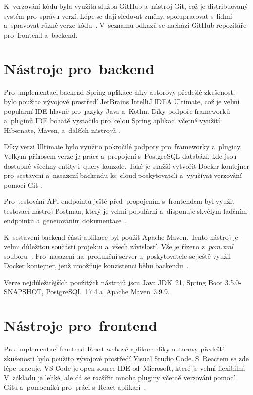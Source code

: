 \documentclass[twoside]{ctuthesis}
\begin{document}
K~verzování kódu byla využita služba GitHub a~nástroj Git, což je distribuovaný systém pro~správu verzí. Lépe se dají sledovat změny, spolupracovat s~lidmi a~spravovat různé verze kódu~\cite{git}. V~seznamu odkazů se nachází GitHub repozitáře pro~frontend a~backend.

\section{Nástroje pro~backend}
\label{sec:sixone}

Pro~implementaci backend Spring aplikace díky autorovy předešlé zkušenosti bylo použito vývojové prostředí JetBrains IntelliJ IDEA Ultimate, což je velmi populární IDE hlavně pro~jazyky Java a~Kotlin. Díky podpoře frameworků a~pluginů IDE bohatě vystačilo pro~celou Spring aplikaci včetně využití Hibernate, Maven, a~dalších nástrojů~\cite{idea}.

Díky verzi Ultimate bylo využito pokročilé podpory pro~frameworky a~pluginy. Velkým přínosem verze je práce a~propojení s~PostgreSQL databází, kde jsou dostupné všechny entity i~query konzole. Také je snažší vytvořit Docker kontejner pro~sestavení a~nasazení backendu ke~cloud poskytovateli a~využívat verzování pomocí Git~\cite{ideaf}.

Pro~testování API endpointů ještě před~propojením s~frontendem byl využit testovací nástroj Postman, který je velmi populární a~disponuje skvělým laděním endpointů a~generováním dokumentace~\cite{postman}.

K~sestavení backend části aplikace byl použit Apache Maven. Tento nástroj je velmi důležitou součástí projektu a~všech závislostí. Vše je řízeno z~\emph{pom.xml} souboru~\cite{maven}. Pro~nasazení na~produkční server u~poskytovatele se ještě využil Docker kontejner, jenž umožňuje konzistenci běhu backendu~\cite{docker}.

Verze nejdůležitějších použitých nástrojů jsou Java JDK~21, Spring Boot 3.5.0-SNAPSHOT, PostgreSQL~17.4 a~Apache Maven~3.9.9.

\section{Nástroje pro~frontend}

Pro~implementaci frontend React webové aplikace díky autorovy předešlé zkušenosti bylo použito vývojové prostředí Visual Studio Code. S~Reactem se zde lépe pracuje. VS Code je open-source IDE od~Microsoft, které je velmi flexibilní. V~základu je lehké, ale dá se rozšířit mnoha pluginy včetně verzování pomocí Gitu a~pomocníků pro~práci s~React aplikací~\cite{vscode}.
\end{document}

